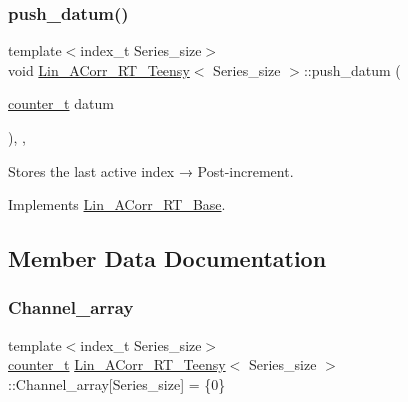 \mbox{\label{classLin__ACorr__RT__Teensy_a0172fa99b6318008a5e623fa9b2ccdcb}} 
\subsubsection{\texorpdfstring{push\+\_\+datum()}{push\_datum()}}
{\footnotesize\ttfamily template$<$index\+\_\+t Series\+\_\+size$>$ \\
void \hyperlink{classLin__ACorr__RT__Teensy}{Lin\+\_\+\+A\+Corr\+\_\+\+R\+T\+\_\+\+Teensy}$<$ Series\+\_\+size $>$\+::push\+\_\+datum (\begin{DoxyParamCaption}\item[{\hyperlink{types_8hpp_a22f279793847eba127de149437848c48}{counter\+\_\+t}}]{datum }\end{DoxyParamCaption})\hspace{0.3cm}{\ttfamily [inline]}, {\ttfamily [override]}, {\ttfamily [virtual]}}



Stores the last active index → Post-\/increment. 



Implements \hyperlink{classLin__ACorr__RT__Base_a398167525faf2a65f29722e943a0c57e}{Lin\+\_\+\+A\+Corr\+\_\+\+R\+T\+\_\+\+Base}.



\subsection{Member Data Documentation}
\mbox{\label{classLin__ACorr__RT__Teensy_af4dda93e07198bae54553a8f11773e74}} 
\subsubsection{\texorpdfstring{Channel\+\_\+array}{Channel\_array}}
{\footnotesize\ttfamily template$<$index\+\_\+t Series\+\_\+size$>$ \\
\hyperlink{types_8hpp_a22f279793847eba127de149437848c48}{counter\+\_\+t} \hyperlink{classLin__ACorr__RT__Teensy}{Lin\+\_\+\+A\+Corr\+\_\+\+R\+T\+\_\+\+Teensy}$<$ Series\+\_\+size $>$\+::Channel\+\_\+array\mbox{[}Series\+\_\+size\mbox{]} = \{0\}}

